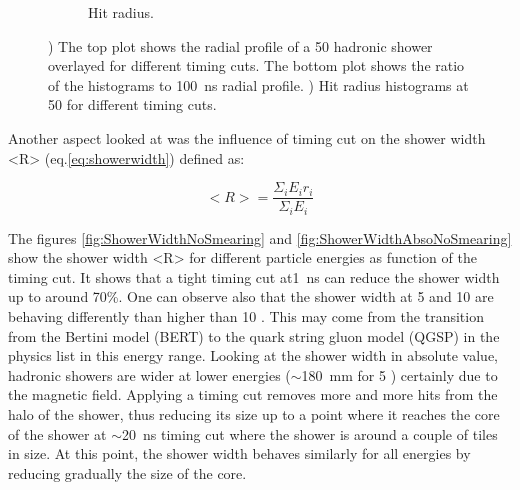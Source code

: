 \begin{figure}[htbp!]
\begin{subfigure}[t]{0.45\textwidth}
    \caption{Hit radius.} \label{fig:HitRadiusSmearing}
  \end{subfigure}
  \caption{) The top plot shows the radial profile of a 50 \GeV hadronic shower overlayed for different timing cuts. The bottom plot shows the ratio of the histograms to \SI{100}{\nano\second} radial profile. ) Hit radius histograms at 50 \GeV for different timing cuts.}
\end{figure}

Another aspect looked at was the influence of timing cut on the shower width <R> (eq.\ref{eq:showerwidth}) defined as:

\begin{equation} \label{eq:showerwidth}
  <R> = \frac{\Sigma_i E_i r_i}{\Sigma_i E_i}
\end{equation}
\vspace{1ex}

The figures \ref{fig:ShowerWidthNoSmearing} and \ref{fig:ShowerWidthAbsoNoSmearing} show the shower width <R> for different particle energies as function of the timing cut. It shows that a tight timing cut at\SI{1}{\nano\second} can reduce the shower width up to around 70\%. One can observe also that the shower width at 5 and 10 \GeV are behaving differently than higher than 10 \GeV. This may come from the transition from the Bertini model (BERT) to the quark string gluon model (QGSP) in the physics list in this energy range. Looking at the shower width in absolute value, hadronic showers are wider at lower energies ($\sim$\SI{180}{\milli\meter} for 5 \GeV) certainly due to the magnetic field. Applying a timing cut removes more and more hits from the halo of the shower, thus reducing its size up to a point where it reaches the core of the shower at $\sim$\SI{20}{\nano\second} timing cut where the shower is around a couple of tiles in size. At this point, the shower width behaves similarly for all energies by reducing gradually the size of the core.


